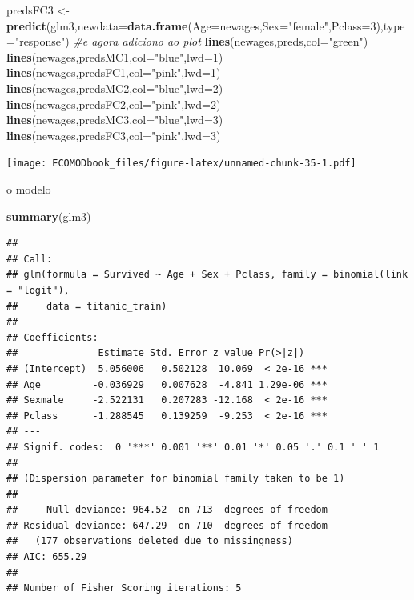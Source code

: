 \documentclass[
]{book}
\newenvironment{Shaded}{\begin{snugshade}}{\end{snugshade}}
\newcommand{\AttributeTok}[1]{\textcolor[rgb]{0.13,0.29,0.53}{#1}}
\newcommand{\CommentTok}[1]{\textcolor[rgb]{0.56,0.35,0.01}{\textit{#1}}}
\newcommand{\DecValTok}[1]{\textcolor[rgb]{0.00,0.00,0.81}{#1}}
\newcommand{\FunctionTok}[1]{\textcolor[rgb]{0.13,0.29,0.53}{\textbf{#1}}}
\newcommand{\NormalTok}[1]{#1}
\newcommand{\OtherTok}[1]{\textcolor[rgb]{0.56,0.35,0.01}{#1}}
\newcommand{\StringTok}[1]{\textcolor[rgb]{0.31,0.60,0.02}{#1}}
\begin{document}
\begin{Shaded}
\begin{Highlighting}[]
\NormalTok{predsFC3 }\OtherTok{\textless{}{-}} \FunctionTok{predict}\NormalTok{(glm3,}\AttributeTok{newdata=}\FunctionTok{data.frame}\NormalTok{(}\AttributeTok{Age=}\NormalTok{newages,}\AttributeTok{Sex=}\StringTok{"female"}\NormalTok{,}\AttributeTok{Pclass=}\DecValTok{3}\NormalTok{),}\AttributeTok{type=}\StringTok{"response"}\NormalTok{)}
\CommentTok{\#e agora adiciono ao plot}
\FunctionTok{lines}\NormalTok{(newages,preds,}\AttributeTok{col=}\StringTok{"green"}\NormalTok{)}
\FunctionTok{lines}\NormalTok{(newages,predsMC1,}\AttributeTok{col=}\StringTok{"blue"}\NormalTok{,}\AttributeTok{lwd=}\DecValTok{1}\NormalTok{)}
\FunctionTok{lines}\NormalTok{(newages,predsFC1,}\AttributeTok{col=}\StringTok{"pink"}\NormalTok{,}\AttributeTok{lwd=}\DecValTok{1}\NormalTok{)}
\FunctionTok{lines}\NormalTok{(newages,predsMC2,}\AttributeTok{col=}\StringTok{"blue"}\NormalTok{,}\AttributeTok{lwd=}\DecValTok{2}\NormalTok{)}
\FunctionTok{lines}\NormalTok{(newages,predsFC2,}\AttributeTok{col=}\StringTok{"pink"}\NormalTok{,}\AttributeTok{lwd=}\DecValTok{2}\NormalTok{)}
\FunctionTok{lines}\NormalTok{(newages,predsMC3,}\AttributeTok{col=}\StringTok{"blue"}\NormalTok{,}\AttributeTok{lwd=}\DecValTok{3}\NormalTok{)}
\FunctionTok{lines}\NormalTok{(newages,predsFC3,}\AttributeTok{col=}\StringTok{"pink"}\NormalTok{,}\AttributeTok{lwd=}\DecValTok{3}\NormalTok{)}
\end{Highlighting}
\end{Shaded}

\texttt{[image: ECOMODbook\_files/figure-latex/unnamed-chunk-35-1.pdf]}

o modelo

\begin{Shaded}
\begin{Highlighting}[]
\FunctionTok{summary}\NormalTok{(glm3)}
\end{Highlighting}
\end{Shaded}

\begin{verbatim}
## 
## Call:
## glm(formula = Survived ~ Age + Sex + Pclass, family = binomial(link = "logit"), 
##     data = titanic_train)
## 
## Coefficients:
##              Estimate Std. Error z value Pr(>|z|)    
## (Intercept)  5.056006   0.502128  10.069  < 2e-16 ***
## Age         -0.036929   0.007628  -4.841 1.29e-06 ***
## Sexmale     -2.522131   0.207283 -12.168  < 2e-16 ***
## Pclass      -1.288545   0.139259  -9.253  < 2e-16 ***
## ---
## Signif. codes:  0 '***' 0.001 '**' 0.01 '*' 0.05 '.' 0.1 ' ' 1
## 
## (Dispersion parameter for binomial family taken to be 1)
## 
##     Null deviance: 964.52  on 713  degrees of freedom
## Residual deviance: 647.29  on 710  degrees of freedom
##   (177 observations deleted due to missingness)
## AIC: 655.29
## 
## Number of Fisher Scoring iterations: 5
\end{verbatim}
\end{document}
